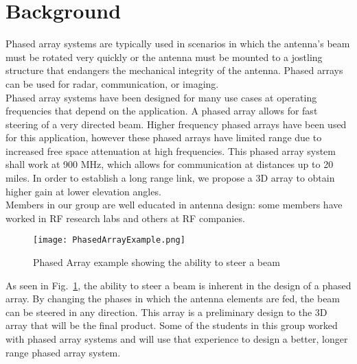 \documentclass[UROP.tex]{subfiles}
\begin{document}
\bigskip
\section{\Large Background}
	Phased array systems are typically used in scenarios in which the antenna's beam must be rotated very quickly or the antenna must be mounted to a jostling structure that endangers the mechanical integrity of the antenna.  Phased arrays can be used for radar, communication, or imaging.   \\
	
	Phased array systems have been designed for many use cases at operating frequencies that depend on the application.  A phased array allows for fast steering of a very directed beam.  Higher frequency phased arrays have been used for this application, however these phased arrays have limited range due to increased free space attenuation at high frequencies.  This phased array system shall work at 900 MHz, which allows for communication at distances up to 20 miles.  In order to establish a long range link, we propose a 3D array to obtain higher gain at lower elevation angles. \\
	
	Members in our group are well educated in antenna design: some members have worked in RF research labs and others at RF companies.  
	
\begin{figure}[H]
\centering
	\texttt{[image: PhasedArrayExample.png]}
	\caption{ Phased Array example showing the ability to steer a beam\label{fig:PAexample}}
\end{figure}
	
	As seen in Fig.~\ref{fig:PAexample}, the ability to steer a beam is inherent in the design of a phased array.  By changing the phases in which the antenna elements are fed, the beam can be steered in any direction. This array is a preliminary design to the 3D array that will be the final product.  Some of the students in this group worked with phased array systems and will use that experience to design a better, longer range phased array system.  
\end{document}

